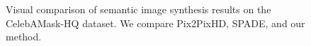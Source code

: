 \begin{figure}[]
\begin{tabular} {cc|cc|c}


\end{tabular}
\vspace{-2mm}
	\caption{Visual  comparison  of  semantic  image  synthesis  results  on  the  CelebAMask-HQ dataset. We compare Pix2PixHD, SPADE, and our method.}
	\label{fig:CelebAMask-HQ results}	
\vspace{-3mm}	
 \end{figure}
 \egroup
 \addtolength{\tabcolsep}{4.5pt}
